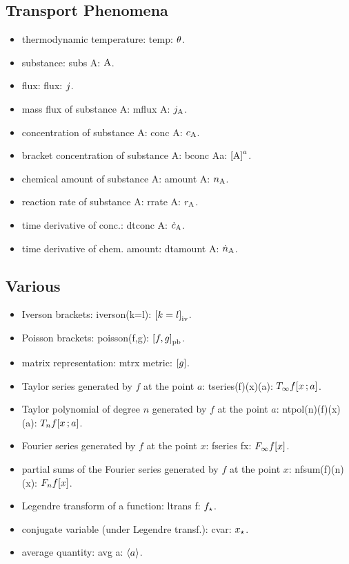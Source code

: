 \begin{multicols}{2}
\subsection{Transport Phenomena}
\begin{itemize}
\item thermodynamic temperature: temp: $\temp$.
\item substance: subs A: $\subs A$.
\item flux: flux: $\flux$.
\item mass flux of substance A: mflux A: $\mflux A$.
\item concentration of substance A: conc A: $\conc A$.
\item bracket concentration of substance A: bconc Aa: $\bconc Aa$.
\item chemical amount of substance A: amount A: $\amount A$.
\item reaction rate of substance A: rrate A: $\rrate A$.
\item time derivative of conc.: dtconc A: $\dtconc A$.
\item time derivative of chem. amount: dtamount A: $\dtamount A$.
\end{itemize}


\subsection{Various}
\begin{itemize}
\item Iverson brackets: iverson(k=l): $\iverson{k=l}$.
\item Poisson brackets: poisson(f,g): $\poisson{f,g}$.
\item matrix representation: mtrx metric: $\mtrx\metric$.
\item Taylor series generated by $f$ at the point $a$: tseries(f)(x)(a): $\tseries{f}{x}{a}$.
\item Taylor polynomial of degree $n$ generated by $f$ at the point $a$: ntpol(n)(f)(x)(a): $\ntpol{n}{f}{x}{a}$.
\item Fourier series generated by $f$ at the point $x$: fseries fx: $\fseries fx$.
\item partial sums of the Fourier series generated by $f$ at the point $x$: nfsum(f)(n)(x): $\nfsum{f}{n}{x}$.
\item Legendre transform of a function: ltrans f: $\ltrans f$.
\item conjugate variable (under Legendre transf.): cvar: $\cvar x$.
\item average quantity: avg a: $\avg a$.
\end{itemize}



\end{multicols}
